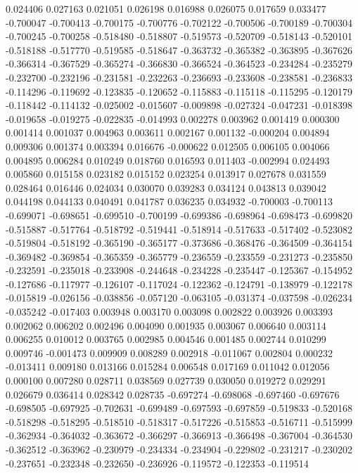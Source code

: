 0.024406
0.027163
0.021051
0.026198
0.016988
0.026075
0.017659
0.033477
-0.700047
-0.700413
-0.700175
-0.700776
-0.702122
-0.700506
-0.700189
-0.700304
-0.700245
-0.700258
-0.518480
-0.518807
-0.519573
-0.520709
-0.518143
-0.520101
-0.518188
-0.517770
-0.519585
-0.518647
-0.363732
-0.365382
-0.363895
-0.367626
-0.366314
-0.367529
-0.365274
-0.366830
-0.366524
-0.364523
-0.234284
-0.235279
-0.232700
-0.232196
-0.231581
-0.232263
-0.236693
-0.233608
-0.238581
-0.236833
-0.114296
-0.119692
-0.123835
-0.120652
-0.115883
-0.115118
-0.115295
-0.120179
-0.118442
-0.114132
-0.025002
-0.015607
-0.009898
-0.027324
-0.047231
-0.018398
-0.019658
-0.019275
-0.022835
-0.014993
0.002278
0.003962
0.001419
0.000300
0.001414
0.001037
0.004963
0.003611
0.002167
0.001132
-0.000204
0.004894
0.009306
0.001374
0.003394
0.016676
-0.000622
0.012505
0.006105
0.004066
0.004895
0.006284
0.010249
0.018760
0.016593
0.011403
-0.002994
0.024493
0.005860
0.015158
0.023182
0.015152
0.023254
0.013917
0.027678
0.031559
0.028464
0.016446
0.024034
0.030070
0.039283
0.034124
0.043813
0.039042
0.044198
0.044133
0.040491
0.041787
0.036235
0.034932
-0.700003
-0.700113
-0.699071
-0.698651
-0.699510
-0.700199
-0.699386
-0.698964
-0.698473
-0.699820
-0.515887
-0.517764
-0.518792
-0.519441
-0.518914
-0.517633
-0.517402
-0.523082
-0.519804
-0.518192
-0.365190
-0.365177
-0.373686
-0.368476
-0.364509
-0.364154
-0.369482
-0.369854
-0.365359
-0.365779
-0.236559
-0.233559
-0.231273
-0.235850
-0.232591
-0.235018
-0.233908
-0.244648
-0.234228
-0.235447
-0.125367
-0.154952
-0.127686
-0.117977
-0.126107
-0.117024
-0.122362
-0.124791
-0.138979
-0.122178
-0.015819
-0.026156
-0.038856
-0.057120
-0.063105
-0.031374
-0.037598
-0.026234
-0.035242
-0.017403
0.003948
0.003170
0.003098
0.002822
0.003926
0.003393
0.002062
0.006202
0.002496
0.004090
0.001935
0.003067
0.006640
0.003114
0.006255
0.010012
0.003765
0.002985
0.004546
0.001485
0.002744
0.010299
0.009746
-0.001473
0.009909
0.008289
0.002918
-0.011067
0.002804
0.000232
-0.013411
0.009180
0.013166
0.015284
0.006548
0.017169
0.011042
0.012056
0.000100
0.007280
0.028711
0.038569
0.027739
0.030050
0.019272
0.029291
0.026679
0.036414
0.028342
0.028735
-0.697274
-0.698068
-0.697460
-0.697676
-0.698505
-0.697925
-0.702631
-0.699489
-0.697593
-0.697859
-0.519833
-0.520168
-0.518298
-0.518295
-0.518510
-0.518317
-0.517226
-0.515853
-0.516711
-0.515999
-0.362934
-0.364032
-0.363672
-0.366297
-0.366913
-0.366498
-0.367004
-0.364530
-0.362512
-0.363962
-0.230979
-0.234334
-0.234904
-0.229802
-0.231217
-0.230202
-0.237651
-0.232348
-0.232650
-0.236926
-0.119572
-0.122353
-0.119514
